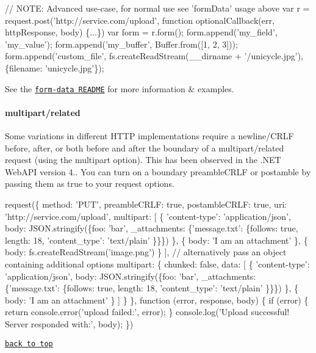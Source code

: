 \begin{DoxyCode}
// NOTE: Advanced use-case, for normal use see 'formData' usage above
var r = request.post('http://service.com/upload', function optionalCallback(err, httpResponse, body) \{...\})
var form = r.form();
form.append('my\_field', 'my\_value');
form.append('my\_buffer', Buffer.from([1, 2, 3]));
form.append('custom\_file', fs.createReadStream(\_\_dirname + '/unicycle.jpg'), \{filename: 'unicycle.jpg'\});
\end{DoxyCode}
 See the \href{https://github.com/form-data/form-data}{\tt form-\/data R\+E\+A\+D\+ME} for more information \& examples.

\paragraph*{multipart/related}

Some variations in different H\+T\+TP implementations require a newline/\+C\+R\+LF before, after, or both before and after the boundary of a {\ttfamily multipart/related} request (using the multipart option). This has been observed in the .N\+ET Web\+A\+PI version 4.. You can turn on a boundary preamble\+C\+R\+LF or postamble by passing them as {\ttfamily true} to your request options.


\begin{DoxyCode}
request(\{
  method: 'PUT',
  preambleCRLF: true,
  postambleCRLF: true,
  uri: 'http://service.com/upload',
  multipart: [
    \{
      'content-type': 'application/json',
      body: JSON.stringify(\{foo: 'bar', \_attachments: \{'message.txt': \{follows: true, length: 18,
       'content\_type': 'text/plain' \}\}\})
    \},
    \{ body: 'I am an attachment' \},
    \{ body: fs.createReadStream('image.png') \}
  ],
  // alternatively pass an object containing additional options
  multipart: \{
    chunked: false,
    data: [
      \{
        'content-type': 'application/json',
        body: JSON.stringify(\{foo: 'bar', \_attachments: \{'message.txt': \{follows: true, length: 18,
       'content\_type': 'text/plain' \}\}\})
      \},
      \{ body: 'I am an attachment' \}
    ]
  \}
\},
function (error, response, body) \{
  if (error) \{
    return console.error('upload failed:', error);
  \}
  console.log('Upload successful!  Server responded with:', body);
\})
\end{DoxyCode}


\href{#table-of-contents}{\tt back to top}





